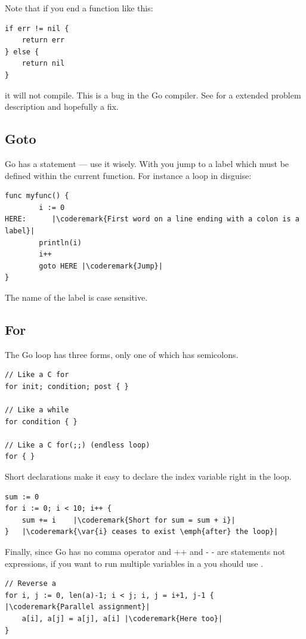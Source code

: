 \begin{lbar}
Note that if you end a function like this:
\begin{lstlisting}
if err != nil {
    return err
} else {
    return nil
}
\end{lstlisting}
it will not compile. This is a bug in the Go compiler. See
\cite{go_issue_65} for a extended problem description and
hopefully a fix.
\end{lbar}

\subsection{Goto}
Go has a  statement --- use it wisely. With 
you jump to a  label which must be defined within the current function.
For instance a loop in disguise:
\begin{lstlisting}
func myfunc() {
        i := 0                                                                                      
HERE:	   |\coderemark{First word on a line ending with a colon is a label}|
        println(i)
        i++ 
        goto HERE |\coderemark{Jump}|
}
\end{lstlisting}
The name of the label is case sensitive.

\subsection{For}
\label{sec:for}
The Go  loop has three forms, only one of
which has semicolons.
\begin{lstlisting}
// Like a C for
for init; condition; post { }

// Like a while
for condition { }

// Like a C for(;;) (endless loop)
for { }
\end{lstlisting}
Short declarations make it easy to declare the index variable right in the loop.
\begin{lstlisting}
sum := 0
for i := 0; i < 10; i++ {
    sum += i	|\coderemark{Short for sum = sum + i}|
}   |\coderemark{\var{i} ceases to exist \emph{after} the loop}|
\end{lstlisting}

Finally, since Go has no comma operator and ++ and - - are statements not
expressions, if you want to run multiple variables in a  you should
use .
\begin{lstlisting}
// Reverse a
for i, j := 0, len(a)-1; i < j; i, j = i+1, j-1 { |\coderemark{Parallel assignment}|
    a[i], a[j] = a[j], a[i] |\coderemark{Here too}|
}
\end{lstlisting}

